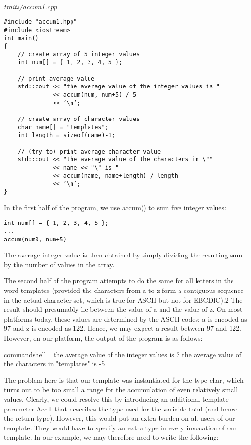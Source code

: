 \hspace*{\fill} \\ %
\noindent
\textit{traits/accum1.cpp}
\begin{lstlisting}[style=styleCXX]
#include "accum1.hpp"
#include <iostream>
int main()
{
	// create array of 5 integer values
	int num[] = { 1, 2, 3, 4, 5 };
	
	// print average value
	std::cout << "the average value of the integer values is "
			  << accum(num, num+5) / 5
			  << ’\n’;
			  
	// create array of character values
	char name[] = "templates";
	int length = sizeof(name)-1;
	
	// (try to) print average character value
	std::cout << "the average value of the characters in \""
			  << name << "\" is "
			  << accum(name, name+length) / length
			  << ’\n’;
}
\end{lstlisting}

In the first half of the program, we use accum() to sum five integer values:

\begin{lstlisting}[style=styleCXX]
int num[] = { 1, 2, 3, 4, 5 };
...
accum(num0, num+5)
\end{lstlisting}

The average integer value is then obtained by simply dividing the resulting sum by the number of values in the array.

The second half of the program attempts to do the same for all letters in the word templates (provided the characters from a to z form a contiguous sequence in the actual character set, which is true for ASCII but not for EBCDIC).2 The result should presumably lie between the value of a and the value of z. On most platforms today, these values are determined by the ASCII codes: a is encoded as 97 and z is encoded as 122. Hence, we may expect a result between 97 and 122. However, on our platform, the output of the program is as follows:

\begin{tcblisting}{commandshell={}}
the average value of the integer values is 3
the average value of the characters in "templates" is -5
\end{tcblisting}

The problem here is that our template was instantiated for the type char, which turns out to be too small a range for the accumulation of even relatively small values. Clearly, we could resolve this by introducing an additional template parameter AccT that describes the type used for the variable total (and hence the return type). However, this would put an extra burden on all users of our template: They would have to specify an extra type in every invocation of our template. In our example, we may therefore need to write the following:

